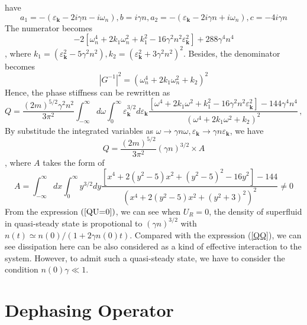 \documentclass{article}
\newcommand{\tmmathbf}[1]{\ensuremath{\boldsymbol{#1}}}
\begin{document}
have
\begin{equation}
  a_1 = - (\varepsilon_{\tmmathbf{k}} - 2 i \gamma n - i \omega_n), b = i
  \gamma n, a_2 = - (\varepsilon_{\tmmathbf{k}} - 2 i \gamma n + i \omega_n),
  c = - 4 i \gamma n
\end{equation}
The numerator becomes
\begin{equation}
  - 2 [\omega_n^4 + 2 k_1 \omega_n^2 + k_1^2 - 16 \gamma^2 n^2
  \varepsilon^2_{\tmmathbf{k}}] + 288 \gamma^4 n^4
\end{equation}
, where $k_1 = (\varepsilon^2_{\tmmathbf{k}} - 5 \gamma^2 n^2), k_2 =
(\varepsilon^2_{\tmmathbf{k}} + 3 \gamma^2 n^2)^2$. Besides, the denominator
becomes
\begin{equation}
  | G^{- 1} |^2 = (\omega_n^4 + 2 k_1 \omega_n^2 + k_2)^2
\end{equation}
Hence, the phase stiffness can be rewritten as
\begin{equation}
  Q = \frac{(2 m)^{5 / 2} \gamma^2 n^2}{3 \pi^2} \int_{- \infty}^{\infty} d
  \omega \int_0^{\infty} \varepsilon_{\tmmathbf{k}}^{3 / 2} d
  \varepsilon_{\tmmathbf{k}} \frac{[\omega^4 + 2 k_1 \omega^2 + k_1^2 - 16
  \gamma^2 n^2 \varepsilon^2_{\tmmathbf{k}}] - 144 \gamma^4 n^4}{(\omega^4 + 2
  k_1 \omega^2 + k_2)^2} \,,
\end{equation}
By substitude the integrated variables as $\omega \rightarrow \gamma n \omega,
\varepsilon_{\tmmathbf{k}} \rightarrow \gamma n \varepsilon_{\tmmathbf{k}}$,
we have
\begin{equation}
  Q = \frac{(2 m)^{5 / 2}}{3 \pi^2} (\gamma n)^{3 / 2} \times A \label{QU=0}
\end{equation}
, where $A$ takes the form of
\begin{equation}
  A = \int_{- \infty}^{\infty} d x \int_0^{\infty} y^{3 / 2} d y \frac{[x^4 +
  2 (y^2 - 5) x^2 + (y^2 - 5)^2 - 16 y^2] - 144}{(x^4 + 2 (y^2 - 5) x^2 + (y^2
  + 3)^2)^2} \neq 0
\end{equation}
From the expression $\left( \ref{QU=0} \right)$, we can see when $U_R = 0$,
the density of superfluid in quasi-steady state is propotional to $(\gamma
n)^{3 / 2}$ with $n (t) \simeq n (0) / (1 + 2 \gamma n (0) t)$. Compared with
the expression (\ref{QQ}), we can see dissipation here can be also considered
as a kind of effective interaction to the system. However, to admit such a
quasi-steady state, we have to consider the condition $n (0) \gamma \ll 1$.

\section{Dephasing Operator}
\end{document}
